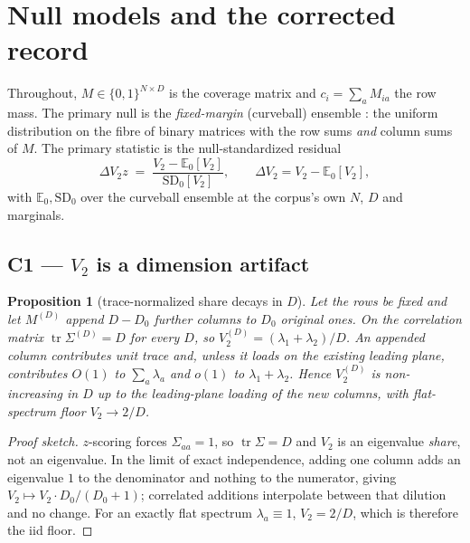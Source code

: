 \documentclass[11pt,a4paper]{article}
\theoremstyle{plain}
\newtheorem{proposition}{Proposition}
\theoremstyle{remark}
\theoremstyle{plain}
\begin{document}
\section{Null models and the corrected record}
\label{sec:nulls}

Throughout, $M\in\{0,1\}^{N\times D}$ is the coverage matrix and $c_i=\sum_aM_{ia}$ the row mass. The primary null is the \emph{fixed-margin} (curveball) ensemble \citep{strona2014,carstens2015}: the uniform distribution on the fibre of binary matrices with the row sums \emph{and} column sums of $M$. The primary statistic is the null-standardized residual
\begin{equation}
\Delta V_2z\;=\;\frac{V_2-\mathbb{E}_0[V_2]}{\mathrm{SD}_0[V_2]},\qquad \Delta V_2=V_2-\mathbb{E}_0[V_2],
\label{eq:dv2z}
\end{equation}
with $\mathbb{E}_0,\mathrm{SD}_0$ over the curveball ensemble at the corpus's own $N$, $D$ and marginals.

\subsection{C1 --- $V_2$ is a dimension artifact}
\label{sec:c1}

\begin{proposition}[trace-normalized share decays in $D$]
\label{prop:dim}
Let the rows be fixed and let $M^{(D)}$ append $D-D_0$ further columns to $D_0$ original ones. On the correlation matrix $\operatorname{tr}\Sigma^{(D)}=D$ for every $D$, so $V_2^{(D)}=(\lambda_1+\lambda_2)/D$. An appended column contributes unit trace and, unless it loads on the existing leading plane, contributes $O(1)$ to $\sum_a\lambda_a$ and $o(1)$ to $\lambda_1+\lambda_2$. Hence $V_2^{(D)}$ is non-increasing in $D$ up to the leading-plane loading of the new columns, with flat-spectrum floor $V_2\to2/D$.
\end{proposition}

\begin{proof}[Proof sketch]
$z$-scoring forces $\Sigma_{aa}=1$, so $\operatorname{tr}\Sigma=D$ and $V_2$ is an eigenvalue \emph{share}, not an eigenvalue. In the limit of exact independence, adding one column adds an eigenvalue $1$ to the denominator and nothing to the numerator, giving $V_2\mapsto V_2\cdot D_0/(D_0+1)$; correlated additions interpolate between that dilution and no change. For an exactly flat spectrum $\lambda_a\equiv1$, $V_2=2/D$, which is therefore the iid floor.
\end{proof}
\end{document}
